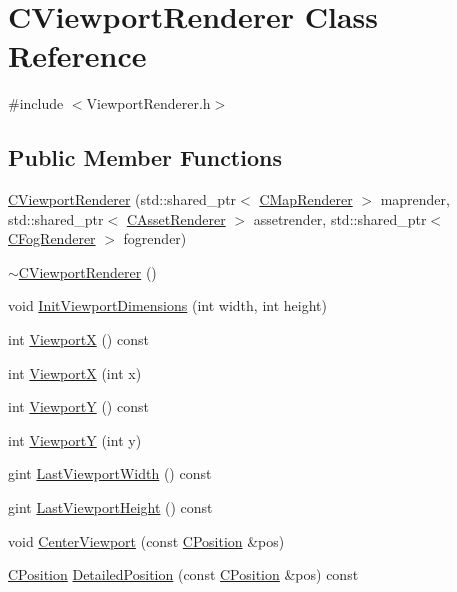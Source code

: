 \hypertarget{classCViewportRenderer}{}\section{C\+Viewport\+Renderer Class Reference}
\label{classCViewportRenderer}


{\ttfamily \#include $<$Viewport\+Renderer.\+h$>$}

\subsection*{Public Member Functions}
\begin{DoxyCompactItemize}
\item 
\hyperlink{classCViewportRenderer_a21067af3982b3e7468e3770c50a7c6a0}{C\+Viewport\+Renderer} (std\+::shared\+\_\+ptr$<$ \hyperlink{classCMapRenderer}{C\+Map\+Renderer} $>$ maprender, std\+::shared\+\_\+ptr$<$ \hyperlink{classCAssetRenderer}{C\+Asset\+Renderer} $>$ assetrender, std\+::shared\+\_\+ptr$<$ \hyperlink{classCFogRenderer}{C\+Fog\+Renderer} $>$ fogrender)
\item 
\hyperlink{classCViewportRenderer_a88d046fb19e26d8d5f331e34aa86d598}{$\sim$\+C\+Viewport\+Renderer} ()
\item 
void \hyperlink{classCViewportRenderer_ab033e4011819d904d25c74e8876e0517}{Init\+Viewport\+Dimensions} (int width, int height)
\item 
int \hyperlink{classCViewportRenderer_adf6c09ee00cdbf0803e72d59bff9a235}{ViewportX} () const
\item 
int \hyperlink{classCViewportRenderer_ac81f563649d991e03cc0f35a86dda296}{ViewportX} (int x)
\item 
int \hyperlink{classCViewportRenderer_add3d4da286927abe2f19fbb37fd42ed5}{ViewportY} () const
\item 
int \hyperlink{classCViewportRenderer_aebbe5e095b192de093376cde3cfc82dc}{ViewportY} (int y)
\item 
gint \hyperlink{classCViewportRenderer_a4d87305e8c2da6933d13c9a98d80bb21}{Last\+Viewport\+Width} () const
\item 
gint \hyperlink{classCViewportRenderer_a55bdef4acd6335ac15f5017ad82111b3}{Last\+Viewport\+Height} () const
\item 
void \hyperlink{classCViewportRenderer_a12842df851be0f115a735cec994d863e}{Center\+Viewport} (const \hyperlink{classCPosition}{C\+Position} \&pos)
\item 
\hyperlink{classCPosition}{C\+Position} \hyperlink{classCViewportRenderer_a2c23b54725686c6219c8765e48351d72}{Detailed\+Position} (const \hyperlink{classCPosition}{C\+Position} \&pos) const

\end{DoxyCompactItemize}
